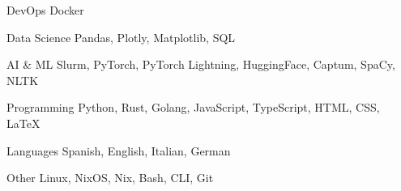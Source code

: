 

\begin{cvskills}

  \cvskill
    {DevOps} %
    {Docker} %

  \cvskill
    {Data Science} %
    {Pandas, Plotly, Matplotlib, SQL} %

  \cvskill
    {AI \& ML} %
    {Slurm, PyTorch, PyTorch Lightning, HuggingFace, Captum, SpaCy, NLTK} %

  \cvskill
    {Programming} %
    {Python, Rust, Golang, JavaScript, TypeScript, HTML, CSS, LaTeX} %

  \cvskill
    {Languages} %
    {Spanish, English, Italian, German} %

  \cvskill
    {Other}
    {Linux, NixOS, Nix, Bash, CLI, Git}

\end{cvskills}
